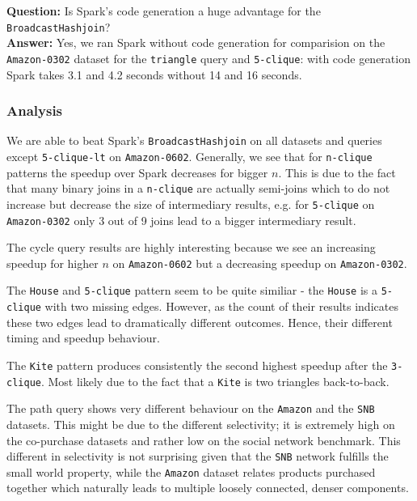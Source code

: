 \textbf{Question:} Is Spark's code generation a huge advantage for the \texttt{BroadcastHashjoin}?\\
\textbf{Answer:} Yes, we ran Spark without code generation for comparision on the \texttt{Amazon-0302} dataset for the \texttt{triangle}
query and \texttt{5-clique}: with code generation Spark takes 3.1 and 4.2 seconds without 14 and 16 seconds.

\subsubsection{Analysis}\label{sssec:seq-analysis}

We are able to beat Spark's \texttt{BroadcastHashjoin} on all datasets and queries except \texttt{5-clique-lt} on \texttt{Amazon-0602}.
Generally, we see that for \texttt{n-clique} patterns the speedup over Spark decreases for bigger $n$.
This is due to the fact that many binary joins in a \texttt{n-clique} are actually semi-joins which to do not increase but decrease the size of intermediary results,
e.g. for \texttt{5-clique} on \texttt{Amazon-0302} only 3 out of 9 joins lead to a bigger intermediary result.

The cycle query results are highly interesting because we see an increasing speedup for higher $n$ on \texttt{Amazon-0602} but a
decreasing speedup on \texttt{Amazon-0302}.

The \texttt{House} and \texttt{5-clique} pattern seem to be quite similiar - the \texttt{House} is a \texttt{5-clique} with two missing
edges.
However, as the count of their results indicates these two edges lead to dramatically different outcomes.
Hence, their different timing and speedup behaviour.

The \texttt{Kite} pattern produces consistently the second highest speedup after the \texttt{3-clique}.
Most likely due to the fact that a \texttt{Kite} is two triangles back-to-back.

The path query shows very different behaviour on the \texttt{Amazon} and the \texttt{SNB} datasets.
This might be due to the different selectivity; it is extremely high on the co-purchase datasets and rather low on the social network
benchmark.
This different in selectivity is not surprising given that the \texttt{SNB} network fulfills the small world property, while the
\texttt{Amazon} dataset relates products purchased together which naturally leads to multiple loosely connected, denser components.

